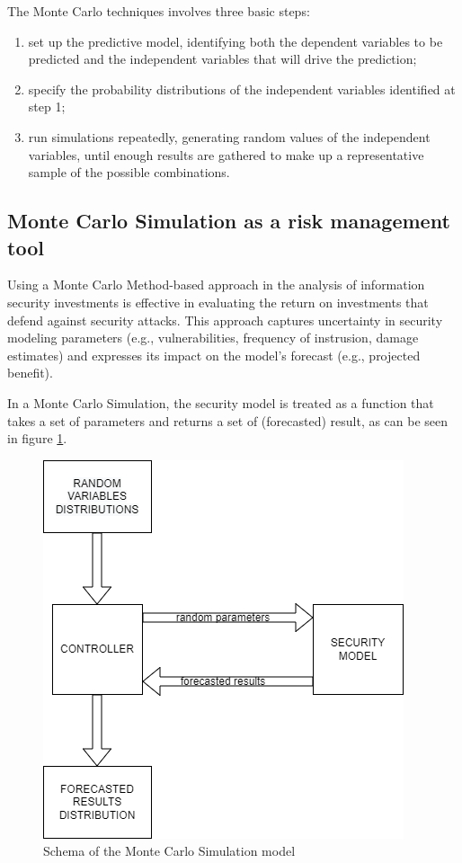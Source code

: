 The Monte Carlo techniques involves three basic steps:
\begin{enumerate}
    \item set up the predictive model, identifying both the dependent variables to be predicted and the independent variables that will drive the prediction;
    \item specify the probability distributions of the independent variables identified at step 1;
    \item run simulations repeatedly, generating random values of the independent variables, until enough results are gathered to make up a representative sample of the possible combinations.
\end{enumerate}

\subsection{Monte Carlo Simulation as a risk management tool}
Using a Monte Carlo Method-based approach in the analysis of information security investments is effective in evaluating the return on investments that defend against security attacks.
This approach captures uncertainty in security modeling parameters (e.g., vulnerabilities, frequency of instrusion, damage estimates) and expresses its impact on the model's forecast (e.g., projected benefit).

In a Monte Carlo Simulation, the security model is treated as a function that takes a set of parameters and returns a set of (forecasted) result, as can be seen in figure \ref{fig:simulation}.

\begin{figure}
\centering
\includegraphics[width=0.8\linewidth]{Resources/mcs.png}
\caption{Schema of the Monte Carlo Simulation model}
\label{fig:simulation}
\end{figure}

